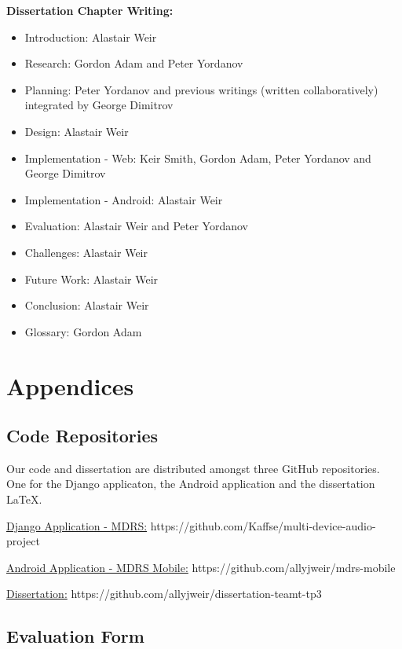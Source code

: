 \documentclass{l3proj}
\begin{document}
\textbf{Dissertation Chapter Writing:}
\begin{itemize}
	\item{Introduction: Alastair Weir}
	\item{Research: Gordon Adam and Peter Yordanov}
	\item{Planning: Peter Yordanov and previous writings (written collaboratively) integrated by George Dimitrov}
	\item{Design: Alastair Weir}
	\item{Implementation - Web: Keir Smith, Gordon Adam, Peter Yordanov and George Dimitrov}
	\item{Implementation - Android: Alastair Weir}
	\item{Evaluation: Alastair Weir and Peter Yordanov}
	\item{Challenges: Alastair Weir}
	\item{Future Work: Alastair Weir}
	\item{Conclusion: Alastair Weir}
	\item{Glossary: Gordon Adam}
\end{itemize}
\section{Appendices}
\subsection{Code Repositories}
Our code and dissertation are distributed amongst three GitHub repositories. One for the Django applicaton, the Android application and the dissertation LaTeX.

\href{https://github.com/Kaffse/multi-device-audio-project}{Django Application - MDRS:}
https://github.com/Kaffse/multi-device-audio-project

\href{https://github.com/allyjweir/mdrs-mobile}{Android Application - MDRS Mobile:}
https://github.com/allyjweir/mdrs-mobile

\href{https://github.com/allyjweir/dissertation-teamt-tp3}{Dissertation:}
https://github.com/allyjweir/dissertation-teamt-tp3

\newpage
\subsection{Evaluation Form}
\end{document}
